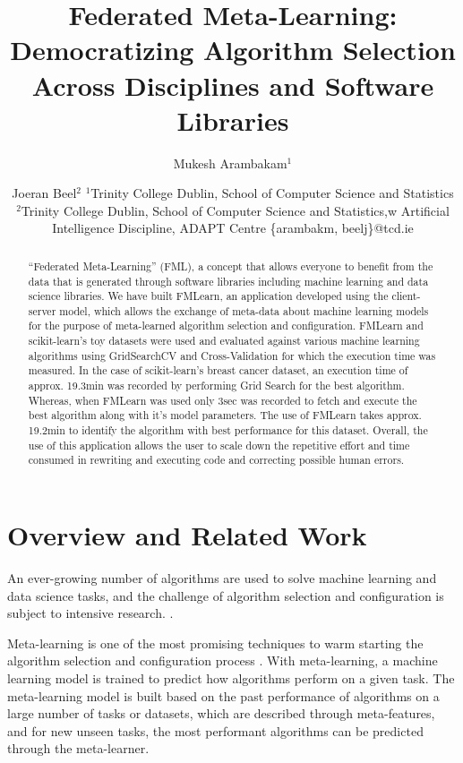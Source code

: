 \documentclass{article}
\title{Federated Meta-Learning: Democratizing Algorithm Selection Across Disciplines and Software Libraries}
\author{
Mukesh Arambakam$^1$
\and
Joeran Beel$^2$
\affiliations
$^1$Trinity College Dublin,
School of Computer Science and Statistics\\
$^2$Trinity College Dublin,
School of Computer Science and Statistics,w
Artificial Intelligence Discipline,
ADAPT Centre
\emails
\{arambakm, beelj\}@tcd.ie
}
\begin{document}
\maketitle

\begin{abstract}
“Federated Meta-Learning” (FML), a concept that allows everyone to benefit from the data that is generated through software libraries including machine learning and data science libraries. We have built FMLearn, an application developed using the client-server model, which allows the exchange of meta-data about machine learning models for the purpose of meta-learned algorithm selection and configuration. FMLearn and scikit-learn’s toy datasets were used and evaluated against various machine learning algorithms using GridSearchCV and Cross-Validation for which the execution time was measured. In the case of scikit-learn’s breast cancer dataset, an execution time of approx. 19.3min was recorded by performing Grid Search for the best algorithm. Whereas, when FMLearn was used only 3sec was recorded to fetch and execute the best algorithm along with it's model parameters. The use of FMLearn takes approx. 19.2min to identify the algorithm with best performance for this dataset. Overall, the use of this application allows the user to scale down the repetitive effort and time consumed in rewriting and executing code and correcting possible human errors.
\end{abstract}

\section{Overview and Related Work}
An ever-growing number of algorithms are used to solve machine learning and data science tasks, and the challenge of algorithm selection and configuration is subject to intensive research. \cite{bischl-et-al,brazdil:p,calandra-et-al,collins-et-al2018,cunha-et-al2017,edenhofer-et-al,ferrari-et-al,hutter-et-al,kotthoff:l,lindauer-et-al,romero-et-al,tu:w,vartak-et-al}.

Meta-learning is one of the most promising techniques to warm starting the algorithm selection and configuration process \cite{hutter-et-al}. With meta-learning, a machine learning model is trained to predict how algorithms perform on a given task. The meta-learning model is built based on the past performance of algorithms on a large number of tasks or datasets, which are described through meta-features, and for new unseen tasks, the most performant algorithms can be predicted through the meta-learner.
\end{document}
